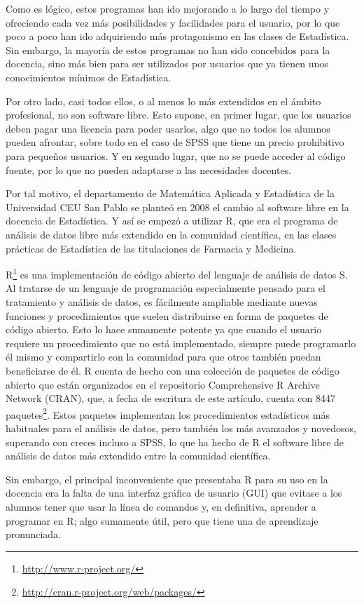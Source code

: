 \documentclass[a4paper,10pt,twoside]{article}
\newcommand{\spss}{\textsf{SPSS}}
\begin{document}
Como es lógico, estos programas han ido mejorando a lo largo del tiempo y ofreciendo cada vez más posibilidades y
facilidades para el usuario, por lo que poco a poco han ido adquiriendo más protagonismo en las clases de Estadística.
Sin embargo, la mayoría de estos programas no han sido concebidos para la docencia, sino más bien para ser utilizados
por usuarios que ya tienen unos conocimientos mínimos de Estadística.

Por otro lado, casi todos ellos, o al menos lo más extendidos en el ámbito profesional, no son software libre.
Esto supone, en primer lugar, que los usuarios deben pagar una licencia para poder usarlos, algo que no todos los
alumnos pueden afrontar, sobre todo en el caso de \spss{} que tiene un precio prohibitivo para pequeños usuarios.
Y en segundo lugar, que no se puede acceder al código fuente, por lo que no pueden adaptarse a las necesidades docentes.

Por tal motivo, el departamento de Matemática Aplicada y Estadística de la Universidad CEU San Pablo se
planteó en 2008 el cambio al software libre en la docencia de Estadística.
Y así se empezó a utilizar R, que era el programa de análisis de datos libre más extendido en la comunidad
científica, en las clases prácticas de Estadística de las titulaciones de Farmacia y Medicina.

R\footnote{\url{http://www.r-project.org/}} \cite{r2001language} es una implementación de código abierto del
lenguaje de análisis de datos S.
Al tratarse de un lenguaje de programación especialmente pensado para el tratamiento y análisis de datos, es fácilmente
ampliable mediante nuevas funciones y procedimientos que suelen distribuirse en forma de paquetes de código abierto.
Esto lo hace sumamente potente ya que cuando el usuario requiere un procedimiento que no está implementado, siempre
puede programarlo él mismo y compartirlo con la comunidad para que otros también puedan beneficiarse de él.
R cuenta de hecho con una colección de paquetes de código abierto que están organizados en el repositorio Comprehensive
R Archive Network (CRAN), que, a fecha de escritura de este artículo, cuenta con 8447
paquetes\footnote{\url{http://cran.r-project.org/web/packages/}}.
Estos paquetes implementan los procedimientos estadísticos más habituales para el análisis de datos, pero también los
más avanzados y novedosos, superando con creces incluso a \spss{}, lo que ha hecho de R el software libre de análisis de
datos más extendido entre la comunidad científica.

Sin embargo, el principal inconveniente que presentaba R para su uso en la docencia era la falta de una interfaz
gráfica de usuario (GUI) que evitase a los alumnos tener que usar la línea de comandos y, en definitiva, aprender a
programar en R; algo sumamente útil, pero que tiene una de aprendizaje pronunciada. 
\end{document}
